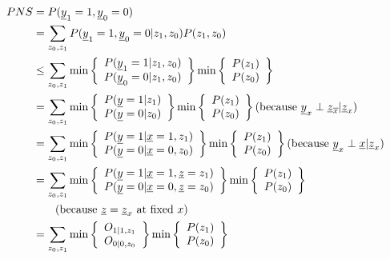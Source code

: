 \begin{align}
PNS&= P({\underline{y}}_1=1, {\underline{y}}_0=0)
\\
&=
\sum_{z_0,z_1}
P({\underline{y}}_1=1, {\underline{y}}_{0}=0|z_1, z_0)P(z_1, z_0)
\\
&\leq
\sum_{z_0,z_1}
\min\left\{\begin{array}{c}
P({\underline{y}}_1=1|z_1, z_0)\\
P({\underline{y}}_{0}=0|z_1, z_0)
\end{array}
\right\}
\min\left\{\begin{array}{c}
P(z_1)
\\
P(z_0)
\end{array}
\right\}
\\
&=
\sum_{z_0,z_1}
\min\left\{\begin{array}{c}
P({\underline{y}}=1|z_1)\\
P({\underline{y}}=0|z_0)
\end{array}
\right\}
\min\left\{\begin{array}{c}
P(z_1)
\\
P(z_0)
\end{array}
\right\}
\text{(because
 ${\underline{y}}_x\perp{\underline{z}}_{\overline{x}}|{\underline{z}}_x$)}
\\
&=
\sum_{z_0,z_1}
\min\left\{\begin{array}{c}
P({\underline{y}}=1|{\underline{x}}=1,z_1)\\
P({\underline{y}}=0|{\underline{x}}=0,z_0)
\end{array}
\right\}
\min\left\{\begin{array}{c}
P(z_1)
\\
P(z_0)
\end{array}
\right\}
\text{(because ${\underline{y}}_x\perp{\underline{x}}|{\underline{z}}_x$)}
\\
&=
\sum_{z_0,z_1}
\min\left\{\begin{array}{c}
P({\underline{y}}=1|{\underline{x}}=1, {\underline{z}}=z_1)\\
P({\underline{y}}=0|{\underline{x}}=0, {\underline{z}}=z_0)
\end{array}
\right\}
\min\left\{\begin{array}{c}
P(z_1)
\\
P(z_0)
\end{array}
\right\}
\\
&\quad\quad \nonumber
\text{(because ${\underline{z}}={\underline{z}}_x$ at fixed $x$)}
\\
&=
\sum_{z_0,z_1}
\min\left\{\begin{array}{c}
O_{1|1,z_1}\\
O_{0|0,z_0}
\end{array}
\right\}
\min\left\{\begin{array}{c}
P(z_1)
\\
P(z_0)
\end{array}
\right\}
\end{align}


